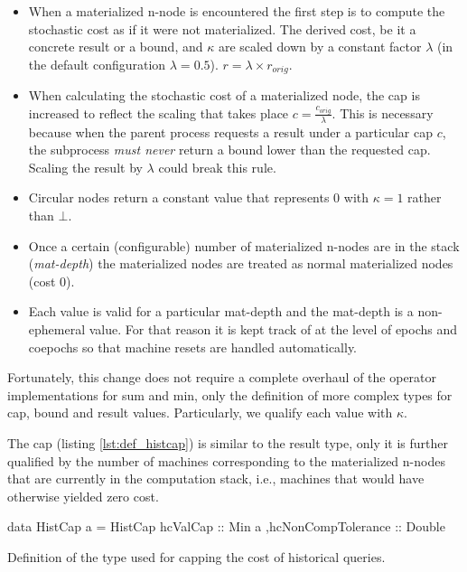 \begin{itemize}
\item When a materialized n-node is encountered the first step is to
  compute the stochastic cost as if it were not materialized. The
  derived cost, be it a concrete result or a bound, and \(\kappa\) are
  scaled down by a constant factor \(\lambda\) (in the default
  configuration \(\lambda = 0.5\)).  \(r = \lambda \times r_{orig}\).
\item When calculating the stochastic cost of a materialized node, the
  cap is increased to reflect the scaling that takes place
  \(c = \frac{c_{orig}}{\lambda}\). This is necessary because when the
  parent process requests a result under a particular cap \(c\), the
  subprocess \emph{must never} return a bound lower than the requested
  cap. Scaling the result by \(\lambda\) could break this rule.
\item Circular nodes return a constant value that represents 0 with
  \(\kappa = 1\) rather than \(\bot\).
\item Once a certain (configurable) number of materialized n-nodes are
  in the stack (\emph{mat-depth}) the materialized nodes are treated
  as normal materialized nodes (cost 0).
\item Each value is valid for a particular mat-depth and the mat-depth
  is a non-ephemeral value. For that reason it is kept track of at the
  level of epochs and coepochs so that machine resets are handled
  automatically.
\end{itemize}

Fortunately, this change does not require a complete overhaul of the
operator implementations for sum and min, only the definition of more
complex types for cap, bound and result values. Particularly, we
qualify each value with \(\kappa\).

The cap (listing \ref{lst:def_histcap}) is similar to the result type,
only it is further qualified by the number of machines corresponding
to the materialized n-nodes that are currently in the computation
stack, i.e., machines that would have otherwise yielded zero cost.

\begin{code}
\begin{haskellcode}
data HistCap a =
  HistCap
  { hcValCap :: Min a
   ,hcNonCompTolerance :: Double
  }
\end{haskellcode}
  \caption{\label{lst:def_histcap}Definition of the type used for
    capping the cost of historical queries.}
\end{code}

